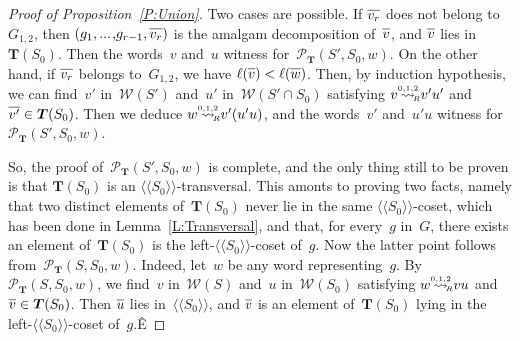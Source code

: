 \documentclass{amsart}
\numberwithin{equation}{section}
\theoremstyle{plain}
\theoremstyle{definition}
\begin{document}
\begin{proof}[Proof of Proposition~\ref{P:Union}]
Two cases are possible. If ${\overline{\vrule width0pt height5pt{{v}_{r}}}}$ does not belong to~${G}_{1,2}$, then $({g}_1 {, ...\hspace{0.2ex},} {g}_{{r}-1}, {\overline{\vrule width0pt height5pt{{v}_{r}}}})$ is the amalgam decomposition of~${\overline{\vrule width0pt height5pt{v}}}$, and ${\overline{\vrule width0pt height5pt{v}}}$ lies in~${\boldsymbol{T}}({S}_0)$. Then the words~${v}$ and~${u}$ witness for~${\mathcal{P}}_{\boldsymbol{T}}({S}', {S}_0, {w})$. On the other hand, if ${\overline{\vrule width0pt height5pt{{v}_{r}}}}$ belongs to~${G}_{1,2}$, we have ${\ell({{\overline{\vrule width0pt height5pt{v}}}})} < {\ell({{\overline{\vrule width0pt height5pt{w}}}})}$. Then, by induction hypothesis, we can find~${v}'$ in~${\mathcal{W}({{S}'})}$ and~${u}'$ in~${\mathcal{W}({{S}' \cap {S}_0})}$ satisfying ${v} {\mathrel{{\mathrel{\overset{\scriptscriptstyle 0,1,2}{\rightsquigarrow}}}_{\hspace{-0.9ex}{\scriptscriptstyle R}}}} {v}' {u}'$ and ${\overline{\vrule width0pt height5pt{{v}'}}} \in {\boldsymbol{T}}({S}_0)$. Then we deduce ${w} {\mathrel{{\mathrel{\overset{\scriptscriptstyle 0,1,2}{\rightsquigarrow}}}_{\hspace{-0.9ex}{\scriptscriptstyle R}}}} {v}' ({u}' {u})$, and the words~${v}'$ and~${u}' {u}$ witness for~${\mathcal{P}}_{\boldsymbol{T}}({S}', {S}_0, {w})$.

So, the proof of~${\mathcal{P}}_{\boldsymbol{T}}({S}', {S}_0, {w})$ is complete, and the only thing still to be proven is that ${\boldsymbol{T}}({S}_0)$ is an ${\langle\!\langle{{{S}_0}}\rangle\!\rangle}$-transversal. This amonts to proving two facts, namely that two distinct elements of~${\boldsymbol{T}}({S}_0)$ never lie in the same ${\langle\!\langle{{{S}_0}}\rangle\!\rangle}$-coset, which has been done in Lemma~\ref{L:Transversal}, and that, for every~${g}$ in~${G}$, there exists an element of~${\boldsymbol{T}}({S}_0)$ is the left-${\langle\!\langle{{{S}_0}}\rangle\!\rangle}$-coset of~${g}$. Now the latter point follows from~${\mathcal{P}}_{\boldsymbol{T}}({S}, {S}_0, {w})$. Indeed, let~${w}$ be any word representing~${g}$. By~${\mathcal{P}}_{\boldsymbol{T}}({S}, {S}_0, {w})$, we find~${v}$ in~${\mathcal{W}({S})}$ and~${u}$ in~${\mathcal{W}({{S}_0})}$ satisfying ${w} {\mathrel{{\mathrel{\overset{\scriptscriptstyle 0,1,2}{\rightsquigarrow}}}_{\hspace{-0.9ex}{\scriptscriptstyle R}}}} {v} {u}$ and ${\overline{\vrule width0pt height5pt{v}}} \in {\boldsymbol{T}}({S}_0)$. Then ${\overline{\vrule width0pt height5pt{u}}}$ lies in~${\langle\!\langle{{{S}_0}}\rangle\!\rangle}$, and ${\overline{\vrule width0pt height5pt{v}}}$ is an element of~${\boldsymbol{T}}({S}_0)$ lying in the left-${\langle\!\langle{{{S}_0}}\rangle\!\rangle}$-coset of~${g}$.Ê 
\end{proof}
\end{document}

